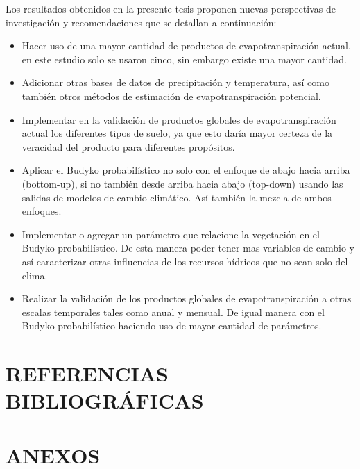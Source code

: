 \documentclass[12pt]{article}
\begin{document}
Los resultados obtenidos en la presente tesis proponen nuevas perspectivas de investigación y recomendaciones que se detallan a continuación:

\begin{itemize}
    \item Hacer uso de una mayor cantidad de productos de evapotranspiración actual, en este estudio solo se usaron cinco, sin embargo existe una mayor cantidad.
    
    \item Adicionar otras bases de datos de precipitación y temperatura, así como también otros métodos de estimación de evapotranspiración potencial.
    
    \item Implementar en la validación de productos globales de evapotranspiración actual los diferentes tipos de suelo, ya que esto daría mayor certeza de la veracidad del producto para diferentes propósitos.
    
    \item Aplicar el Budyko probabilístico no solo con el enfoque de abajo hacia arriba (bottom-up), si no también desde arriba hacia abajo (top-down) usando las salidas de modelos de cambio climático. Así también la mezcla de ambos enfoques.

    \item Implementar o agregar un parámetro que relacione la vegetación en el Budyko probabilístico. De esta manera poder tener mas variables de cambio y así caracterizar otras influencias de los recursos hídricos que no sean solo del clima.
    
    \item Realizar la validación de los productos globales de evapotranspiración a otras escalas temporales tales como anual y mensual. De igual manera con el Budyko probabilístico haciendo uso de mayor cantidad de parámetros.
    
    
\end{itemize}


\clearpage
\vspace*{0.5mm}
\section{REFERENCIAS BIBLIOGRÁFICAS}




\clearpage
\vspace*{0.5mm}
\section{ANEXOS}
\end{document}
